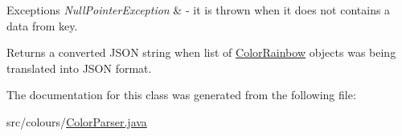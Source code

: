 \begin{DoxyExceptions}{Exceptions}
{\em Null\+Pointer\+Exception} & -\/ it is thrown when it does not contains a data from key. \\
\hline
\end{DoxyExceptions}
\begin{DoxyReturn}{Returns}
a converted J\+S\+ON string when list of \hyperlink{classcolours_1_1_color_rainbow}{Color\+Rainbow} objects was being translated into J\+S\+ON format. 
\end{DoxyReturn}


The documentation for this class was generated from the following file\+:\begin{DoxyCompactItemize}
\item 
src/colours/\hyperlink{_color_parser_8java}{Color\+Parser.\+java}\end{DoxyCompactItemize}
